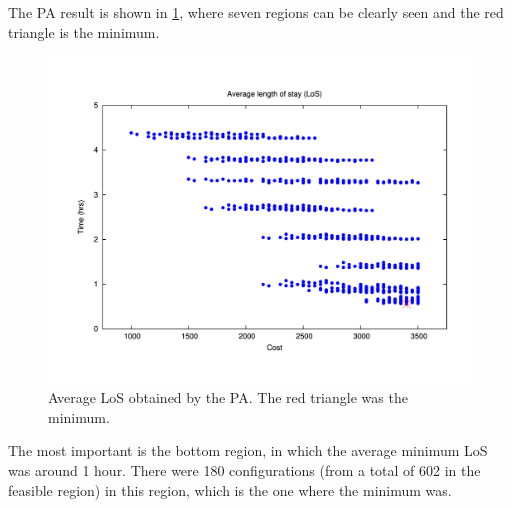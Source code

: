 \documentclass[11pt]{article} %
\begin{document}
The PA result is shown in \ref{subfig:pipe8-1}, where seven regions
can be clearly seen and the red triangle is the minimum.
\begin{figure}[H]
\noindent \begin{centering}
\includegraphics[width=0.95\columnwidth,height=0.25\paperheight]{figs4/v0/6400-602-50-pipe-LoS-min}
\par\end{centering}

\caption{Average LoS obtained by the PA. The red triangle was the minimum.
\label{subfig:pipe8-1}}
\end{figure}
 The most important is the bottom region, in which the average minimum
LoS was around 1 hour. There were 180 configurations (from a total
of 602 in the feasible region) in this region, which is the one where
the minimum was.
\end{document}
